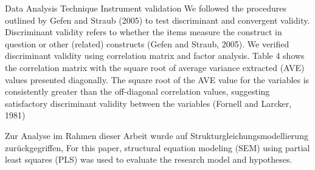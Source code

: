 Data Analysis Technique
Instrument validation
We followed the procedures outlined by Gefen and Straub (2005) to test discriminant and convergent validity. Discriminant validity refers to whether the items measure the construct in question or other (related) constructs (Gefen and Straub, 2005). We verified discriminant validity using correlation matrix and factor analysis. Table 4 shows the correlation matrix with the square root of average variance extracted (AVE) values presented diagonally. The square root of the AVE value for the variables is consistently greater than the off-diagonal correlation values, suggesting satisfactory discriminant validity between the variables (Fornell and Larcker, 1981)

Zur Analyse im Rahmen dieser Arbeit wurde auf Strukturgleichungsmodellierung zurückgegriffen, 
For this paper, structural equation modeling (SEM) using partial least squares (PLS) was used to evaluate the research model and hypotheses.



